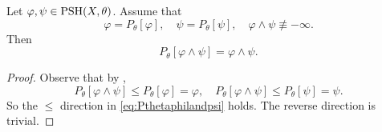 \begin{proposition}\label{prop:landpresmodel}
    Let $\varphi,\psi\in \mathrm{PSH}(X,\theta)$. Assume that
    \begin{equation}\label{eq:varphipsimodel_landpsh}
        \varphi=P_{\theta}[\varphi],\quad \psi=P_{\theta}[\psi],\quad \varphi\land \psi\not\equiv -\infty.
    \end{equation}
    Then
    \begin{equation}\label{eq:Pthetaphilandpsi}
        P_{\theta}[\varphi\land \psi]=\varphi\land \psi.
    \end{equation}
\end{proposition}
\begin{proof}
    Observe that by ,
    \[
        P_{\theta}[\varphi\land \psi]\leq P_{\theta}[\varphi]=\varphi,\quad P_{\theta}[\varphi\land \psi]\leq P_{\theta}[\psi]=\psi.
    \]
    So the $\leq$ direction in \eqref{eq:Pthetaphilandpsi} holds. The reverse direction is trivial.
\end{proof}

